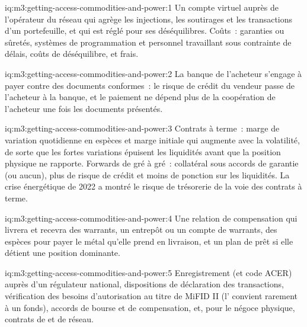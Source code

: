 \begin{solution}{iq:m3:getting-access-commodities-and-power:1}
Un compte virtuel auprès de l'opérateur du réseau qui agrège les injections, les soutirages et les transactions d'un portefeuille, et qui est
réglé pour ses déséquilibres. Coûts~: garanties ou sûretés, systèmes de programmation et personnel travaillant sous contrainte de délais,
coûts de déséquilibre, et frais.
\end{solution}

\begin{solution}{iq:m3:getting-access-commodities-and-power:2}
La banque de l'acheteur s'engage à payer contre des documents conformes~: le risque de crédit du vendeur passe de l'acheteur
à la banque, et le paiement ne dépend plus de la coopération de l'acheteur une fois les documents présentés.
\end{solution}

\begin{solution}{iq:m3:getting-access-commodities-and-power:3}
Contrats à terme~: marge de variation quotidienne en espèces et marge initiale qui augmente avec la volatilité, de sorte que les fortes variations épuisent
les liquidités avant que la position physique ne rapporte. Forwards de gré à gré~: collatéral sous accords de garantie (ou aucun),
plus de risque de crédit et moins de ponction sur les liquidités. La crise énergétique de 2022 a montré le risque de trésorerie de la voie des contrats à terme.
\end{solution}

\begin{solution}{iq:m3:getting-access-commodities-and-power:4}
Une relation de compensation qui livrera et recevra des warrants, un entrepôt ou un compte de warrants, des espèces pour payer
le métal qu'elle prend en livraison, et un plan de prêt si elle détient une position dominante.
\end{solution}

\begin{solution}{iq:m3:getting-access-commodities-and-power:5}
Enregistrement  (et code ACER) auprès d'un régulateur national, dispositions de déclaration des transactions, vérification des
besoins d'autorisation au titre de MiFID II (l' convient rarement à un fonds), accords de bourse et de
compensation, et, pour le négoce physique, contrats de  et de réseau.
\end{solution}

